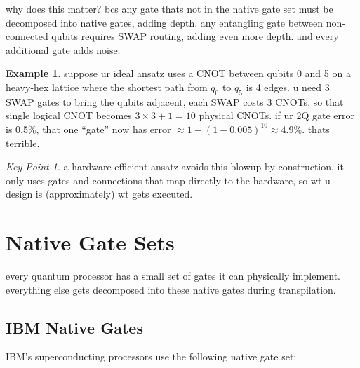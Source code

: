 \documentclass[11pt,a4paper]{article}
\theoremstyle{definition}
\newtheorem{example}{Example}[section]
\theoremstyle{remark}
\newtheorem*{keypoint}{Key Point}
\begin{document}
why does this matter? bcs any gate thats not in the native gate set must be decomposed into native gates, adding depth. any entangling gate between non-connected qubits requires SWAP routing, adding even more depth. and every additional gate adds noise.

\begin{example}
suppose ur ideal ansatz uses a CNOT between qubits 0 and 5 on a heavy-hex lattice where the shortest path from $q_0$ to $q_5$ is 4 edges. u need 3 SWAP gates to bring the qubits adjacent, each SWAP costs 3 CNOTs, so that single logical CNOT becomes $3 \times 3 + 1 = 10$ physical CNOTs. if ur 2Q gate error is 0.5\%, that one ``gate'' now has error $\approx 1 - (1-0.005)^{10} \approx 4.9\%$. thats terrible.
\end{example}

\begin{keypoint}
a hardware-efficient ansatz avoids this blowup by construction. it only uses gates and connections that map directly to the hardware, so wt u design is (approximately) wt gets executed.
\end{keypoint}

\section{Native Gate Sets}

every quantum processor has a small set of gates it can physically implement. everything else gets decomposed into these native gates during transpilation.

\subsection{IBM Native Gates}

IBM's superconducting processors use the following native gate set:
\end{document}

